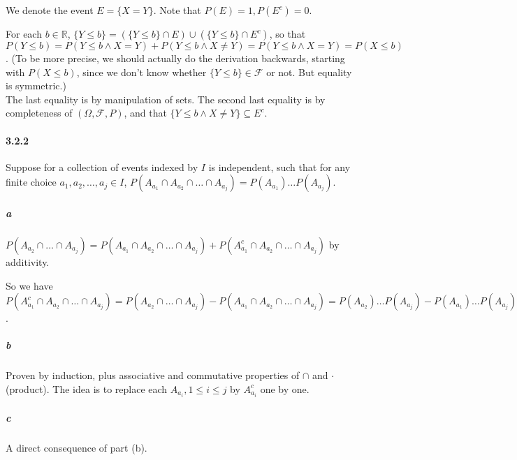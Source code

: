 \documentclass[a4paper]{article}
\newcommand{\alg}[0]{\mathcal{F}} %
\newcommand{\triple}[0]{(\Omega, \alg, P)} %
\newcommand{\real}[0]{\mathbb{R}} %
\newcommand{\seq}[2]{#1_1,#1_2,\dots,#1_{#2}} %
\newcommand{\subseqconn}[4]{#1_{#2_1} #4 #1_{#2_2} #4 \dots #4 #1_{#2_{#3}}} %
\begin{document}
We denote the event $E=\{X=Y\}$. Note that $P(E) = 1, P(E^c) = 0$.

For each $b\in\real$, $\{Y\leq b\} = (\{Y\leq b\}\cap E) \cup (\{Y\leq b\}\cap E^c)$, so that $P(Y\leq b) = P(Y\leq b\land X=Y) + P(Y\leq b\land X\neq Y) = P(Y\leq b\land X=Y) = P(X\leq b)$. (To be more precise, we should actually do the derivation backwards, starting with $P(X\leq b)$, since we don't know whether $\{Y\leq b\}\in \alg$ or not. But equality is symmetric.)\\
The last equality is by manipulation of sets. The second last equality is by completeness of $\triple$, and that $\{Y\leq b\land X\neq Y\}\subseteq E^c$.

\paragraph{3.2.2} Suppose for a collection of events indexed by $I$ is independent, such that for any finite choice $\seq{a}{j}\in I$, $P(\subseqconn{A}{a}{j}{\cap})=P(A_{a_1})\dots P(A_{a_j})$.

\subparagraph{a} $P(A_{a_2}\cap\dots\cap A_{a_j}) = P(\subseqconn{A}{a}{j}{\cap}) + P(A_{a_1}^c\cap A_{a_2}\cap\dots\cap A_{a_j})$ by additivity.

So we have $P(A_{a_1}^c\cap A_{a_2}\cap\dots\cap A_{a_j}) = P(A_{a_2}\cap\dots\cap A_{a_j}) - P(\subseqconn{A}{a}{j}{\cap}) = P(A_{a_2})\dots P(A_{a_j}) - P(A_{a_1})\dots P(A_{a_j}) = (1-P(A_{a_1})P(A_{a_2})\dots P(A_{a_j}) = P(A_{a_1}^c)P(A_{a_2})\dots P(A_{a_j})$.

\subparagraph{b} Proven by induction, plus associative and commutative properties of $\cap$ and $\cdot$ (product). The idea is to replace each $A_{a_i}, 1\leq i\leq j$ by $A_{a_i}^c$ one by one.

\subparagraph{c} A direct consequence of part (b).
\end{document}

